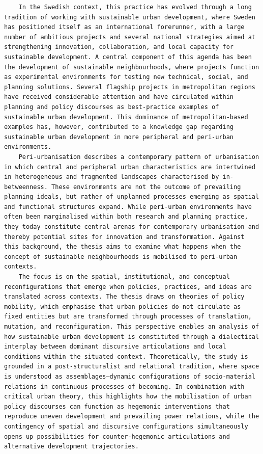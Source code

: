 \begin{casestudySection}
\begin{lstlisting}
    In the Swedish context, this practice has evolved through a long tradition of working with sustainable urban development, where Sweden has positioned itself as an international forerunner, with a large number of ambitious projects and several national strategies aimed at strengthening innovation, collaboration, and local capacity for sustainable development. A central component of this agenda has been the development of sustainable neighbourhoods, where projects function as experimental environments for testing new technical, social, and planning solutions. Several flagship projects in metropolitan regions have received considerable attention and have circulated within planning and policy discourses as best-practice examples of sustainable urban development. This dominance of metropolitan-based examples has, however, contributed to a knowledge gap regarding sustainable urban development in more peripheral and peri-urban environments.
    Peri-urbanisation describes a contemporary pattern of urbanisation in which central and peripheral urban characteristics are intertwined in heterogeneous and fragmented landscapes characterised by in-betweenness. These environments are not the outcome of prevailing planning ideals, but rather of unplanned processes emerging as spatial and functional structures expand. While peri-urban environments have often been marginalised within both research and planning practice, they today constitute central arenas for contemporary urbanisation and thereby potential sites for innovation and transformation. Against this background, the thesis aims to examine what happens when the concept of sustainable neighbourhoods is mobilised to peri-urban contexts.
    The focus is on the spatial, institutional, and conceptual reconfigurations that emerge when policies, practices, and ideas are translated across contexts. The thesis draws on theories of policy mobility, which emphasise that urban policies do not circulate as fixed entities but are transformed through processes of translation, mutation, and reconfiguration. This perspective enables an analysis of how sustainable urban development is constituted through a dialectical interplay between dominant discursive articulations and local conditions within the situated context. Theoretically, the study is grounded in a post-structuralist and relational tradition, where space is understood as assemblages—dynamic configurations of socio-material relations in continuous processes of becoming. In combination with critical urban theory, this highlights how the mobilisation of urban policy discourses can function as hegemonic interventions that reproduce uneven development and prevailing power relations, while the contingency of spatial and discursive configurations simultaneously opens up possibilities for counter-hegemonic articulations and alternative development trajectories.

\end{lstlisting}
\end{casestudySection}
